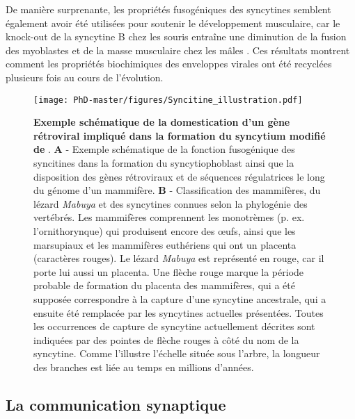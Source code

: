 De manière surprenante, les propriétés fusogéniques des syncytines semblent également avoir été  utilisées pour soutenir le développement musculaire, car le knock-out de la syncytine B chez les souris entraîne une diminution de la fusion des myoblastes et de la masse musculaire chez les mâles \citep{redelsperger_genetic_2016}. Ces résultats montrent comment les propriétés biochimiques des enveloppes virales ont été recyclées plusieurs fois au cours de l'évolution.

\begin{figure}[H]
\captionsetup{font=footnotesize}
 \centering
  \texttt{[image: PhD-master/figures/Syncitine\_illustration.pdf]}
\caption[Intro:Illustration d'un gène de rétrovirus impliqué dans la production du syncitium chez les mammifères placentaires]{\textbf{Exemple schématique de la domestication d'un gène rétroviral impliqué dans la formation du syncytium modifié de} \cite{chuong_placenta_2018, cornelis_endogenous_2017}. \textbf{A} -  Exemple schématique de la fonction fusogénique des syncitines dans la formation du syncytiophoblast ainsi que la disposition des gènes rétroviraux et de séquences régulatrices le long du génome d'un mammifère. \textbf{B} -  Classification des mammifères, du lézard \textit{Mabuya} et des syncytines connues selon la phylogénie des vertébrés. Les mammifères comprennent les monotrèmes (p. ex. l'ornithorynque) qui produisent encore des œufs, ainsi que les marsupiaux et les mammifères euthériens qui ont un placenta (caractères rouges). Le lézard \textit{Mabuya} est représenté en rouge, car il porte lui aussi un placenta. Une flèche rouge marque la période probable de formation du placenta des mammifères, qui a été supposée correspondre à la capture d'une syncytine ancestrale, qui a ensuite été remplacée par les syncytines actuelles présentées. Toutes les occurrences de capture de syncytine actuellement décrites sont indiquées par des pointes de flèche rouges à côté du nom de la syncytine. Comme l'illustre l'échelle située sous l'arbre, la longueur des branches est liée au temps en millions d'années.}
\label{figure:Syncitine_illustration}
\end{figure}

\subsection{La communication synaptique}

